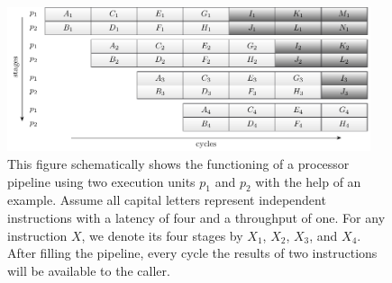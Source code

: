 \documentclass{stdlocal}
\begin{document}
    \begin{figure}
      \center
      \includegraphics[width=0.95\textwidth]{figures/multiple_unit_pipeline.pdf}
      \caption[Multiple Execution Unit Processor Pipeline]{%
        This figure schematically shows the functioning of a processor pipeline using two execution units $p_1$ and $p_2$ with the help of an example.
        Assume all capital letters represent independent instructions with a latency of four and a throughput of one.
        For any instruction $X$, we denote its four stages by $X_1$, $X_2$, $X_3$, and $X_4$.
        After filling the pipeline, every cycle the results of two instructions will be available to the caller.
      }
      \label{fig:multiple-unit-pipeline}
    \end{figure}
\end{document}
